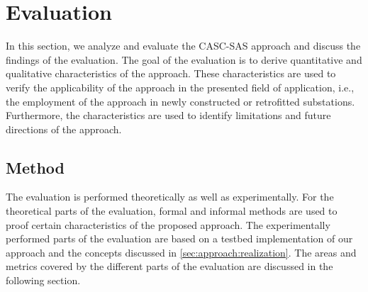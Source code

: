 \chapter{Evaluation}
\label{ch:evaluation}
In this section, we analyze and evaluate the CASC-SAS approach and discuss the findings of the evaluation.
The goal of the evaluation is to derive quantitative and qualitative characteristics of the approach.
These characteristics are used to verify the applicability of the approach in the presented field of application, i.e., the employment of the approach in newly constructed or retrofitted substations.
Furthermore, the characteristics are used to identify limitations and future directions of the approach.

\section{Method}
The evaluation is performed theoretically as well as experimentally.
For the theoretical parts of the evaluation, formal and informal methods are used to proof certain characteristics of the proposed approach.
The experimentally performed parts of the evaluation are based on a testbed implementation of our approach and the concepts discussed in \autoref{sec:approach:realization}.
The areas and metrics covered by the different parts of the evaluation are discussed in the following section.

